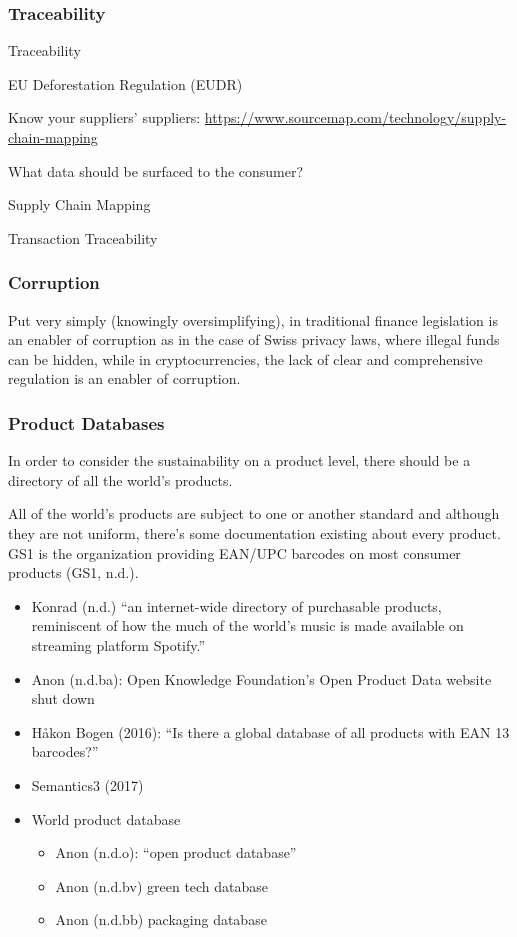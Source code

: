 \documentclass[
  letterpaper,
  DIV=11,
  numbers=noendperiod]{scrartcl}
\begin{document}
\subsubsection{Traceability}\label{traceability}

Traceability

EU Deforestation Regulation (EUDR)

Know your suppliers' suppliers:
\url{https://www.sourcemap.com/technology/supply-chain-mapping}

What data should be surfaced to the consumer?

Supply Chain Mapping

Transaction Traceability

\subsubsection{Corruption}\label{corruption}

Put very simply (knowingly oversimplifying), in traditional finance
legislation is an enabler of corruption as in the case of Swiss privacy
laws, where illegal funds can be hidden, while in cryptocurrencies, the
lack of clear and comprehensive regulation is an enabler of corruption.

\subsubsection{Product Databases}\label{product-databases}

In order to consider the sustainability on a product level, there should
be a directory of all the world's products.

All of the world's products are subject to one or another standard and
although they are not uniform, there's some documentation existing about
every product. GS1 is the organization providing EAN/UPC barcodes on
most consumer products (GS1, n.d.).

\begin{itemize}
\item
  Konrad (n.d.) ``an internet-wide directory of purchasable products,
  reminiscent of how the much of the world's music is made available on
  streaming platform Spotify.''
\item
  Anon (n.d.ba): Open Knowledge Foundation's Open Product Data website
  shut down
\item
  Håkon Bogen (2016): ``Is there a global database of all products with
  EAN 13 barcodes?''
\item
  Semantics3 (2017)
\item
  World product database

  \begin{itemize}
  \item
    Anon (n.d.o): ``open product database''
  \item
    Anon (n.d.bv) green tech database
  \item
    Anon (n.d.bb) packaging database
  \end{itemize}
\end{itemize}
\end{document}
